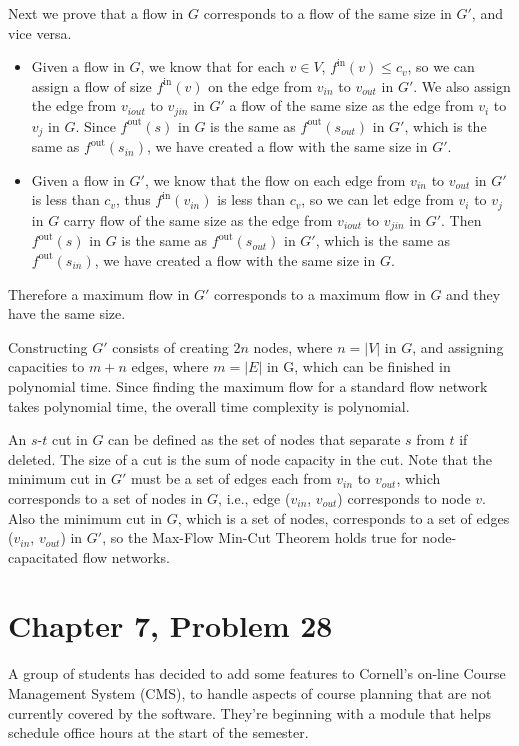 \documentclass[12pt,letterpaper]{article}
\begin{document}
Next we prove that a flow in $G$ corresponds to a flow of the same size in $G'$, and vice versa.
\begin{itemize}
\item Given a flow in $G$, we know that for each $v\in V$, $f^{\textrm{in}}(v)\le c_v$, so we can assign a flow of size $f^{\textrm{in}}(v)$ on the edge from $v_{in}$ to $v_{out}$ in $G'$. We also assign the edge from $v_{iout}$ to $v_{jin}$ in $G'$ a flow of the same size as the edge from $v_i$ to $v_j$ in $G$. Since $f^{\textrm{out}}(s)$ in $G$ is the same as $f^{\textrm{out}}(s_{out})$ in $G'$, which is the same as $f^{\textrm{out}}(s_{in})$, we have created a flow with the same size in $G'$.
\item Given a flow in $G'$, we know that the flow on each edge from $v_{in}$ to $v_{out}$ in $G'$ is less than $c_v$, thus $f^{\textrm{in}}(v_{in})$ is less than $c_v$, so we can let edge from $v_i$ to $v_j$ in $G$ carry flow of the same size as the edge from $v_{iout}$ to $v_{jin}$ in $G'$. Then $f^{\textrm{out}}(s)$ in $G$ is the same as $f^{\textrm{out}}(s_{out})$ in $G'$, which is the same as $f^{\textrm{out}}(s_{in})$, we have created a flow with the same size in $G$.
\end{itemize}
Therefore a maximum flow in $G'$ corresponds to a maximum flow in $G$ and they have the same size.

Constructing $G'$ consists of creating $2n$ nodes, where $n = |V|$ in $G$, and assigning capacities to $m+n$ edges, where $m = |E|$ in G, which can be finished in polynomial time. Since finding the maximum flow for a standard flow network takes polynomial time, the overall time complexity is polynomial.

An $s$-$t$ cut in $G$ can be defined as the set of nodes that separate $s$ from $t$ if deleted. The size of a cut is the sum of node capacity in the cut. Note that the minimum cut in $G'$ must be a set of edges each from $v_{in}$ to $v_{out}$, which corresponds to a set of nodes in $G$, i.e., edge ($v_{in}$, $v_{out}$) corresponds to node $v$. Also the minimum cut in $G$, which is a set of nodes, corresponds to a set of edges ($v_{in}$, $v_{out}$) in $G'$, so the Max-Flow Min-Cut Theorem holds true for node-capacitated flow networks.

\section*{Chapter 7, Problem 28}
A group of students has decided to add some features to Cornell's on-line
Course Management System (CMS), to handle aspects of course planning
that are not currently covered by the software. They're beginning with a
module that helps schedule office hours at the start of the semester.
\end{document}
